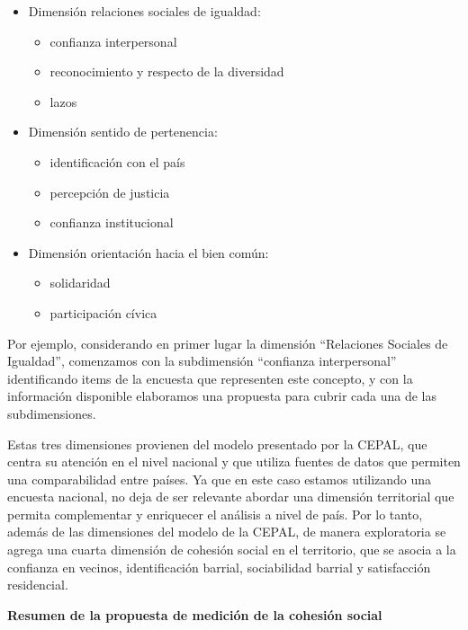 \documentclass[
  12pt,
]{book}
\providecommand{\tightlist}{%
  \setlength{\itemsep}{0pt}\setlength{\parskip}{0pt}}
\begin{document}
\begin{itemize}
\tightlist
\item
  Dimensión relaciones sociales de igualdad:

  \begin{itemize}
  \tightlist
  \item
    confianza interpersonal
  \item
    reconocimiento y respecto de la diversidad
  \item
    lazos
  \end{itemize}
\item
  Dimensión sentido de pertenencia:

  \begin{itemize}
  \tightlist
  \item
    identificación con el país
  \item
    percepción de justicia
  \item
    confianza institucional
  \end{itemize}
\item
  Dimensión orientación hacia el bien común:

  \begin{itemize}
  \tightlist
  \item
    solidaridad
  \item
    participación cívica
  \end{itemize}
\end{itemize}

Por ejemplo, considerando en primer lugar la dimensión ``Relaciones Sociales de Igualdad'', comenzamos con la subdimensión ``confianza interpersonal'' identificando items de la encuesta que representen este concepto, y con la información disponible elaboramos una propuesta para cubrir cada una de las subdimensiones.

Estas tres dimensiones provienen del modelo presentado por la CEPAL, que centra su atención en el nivel nacional y que utiliza fuentes de datos que permiten una comparabilidad entre países. Ya que en este caso estamos utilizando una encuesta nacional, no deja de ser relevante abordar una dimensión territorial que permita complementar y enriquecer el análisis a nivel de país. Por lo tanto, además de las dimensiones del modelo de la CEPAL, de manera exploratoria se agrega una cuarta dimensión de cohesión social en el territorio, que se asocia a la confianza en vecinos, identificación barrial, sociabilidad barrial y satisfacción residencial.

\textbf{Resumen de la propuesta de medición de la cohesión social}
\end{document}
